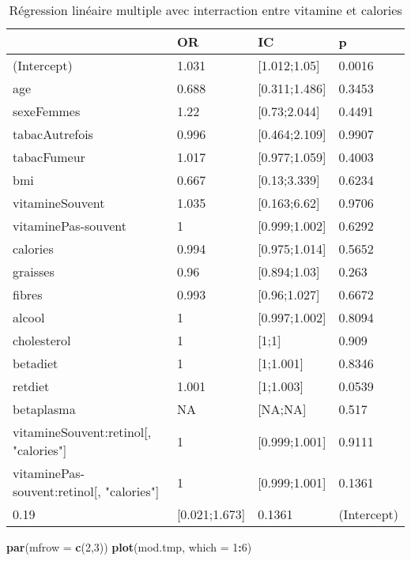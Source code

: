 \documentclass[]{article}
\newenvironment{Shaded}{\begin{snugshade}}{\end{snugshade}}
\newcommand{\KeywordTok}[1]{\textcolor[rgb]{0.13,0.29,0.53}{\textbf{#1}}}
\newcommand{\DataTypeTok}[1]{\textcolor[rgb]{0.13,0.29,0.53}{#1}}
\newcommand{\DecValTok}[1]{\textcolor[rgb]{0.00,0.00,0.81}{#1}}
\newcommand{\OperatorTok}[1]{\textcolor[rgb]{0.81,0.36,0.00}{\textbf{#1}}}
\newcommand{\NormalTok}[1]{#1}
\begin{document}
\begin{table}

\caption{\label{tab:unnamed-chunk-87}Régression linéaire multiple avec interraction entre vitamine et calories}
\centering
\begin{tabular}[t]{l|l|l|l}
\hline
  & OR & IC & p\\
\hline
\rowcolor[HTML]{BBD2E1}  (Intercept) & 1.031 & [1.012;1.05] & 0.0016\\
\hline
age & 0.688 & [0.311;1.486] & 0.3453\\
\hline
\rowcolor[HTML]{BBD2E1}  sexeFemmes & 1.22 & [0.73;2.044] & 0.4491\\
\hline
tabacAutrefois & 0.996 & [0.464;2.109] & 0.9907\\
\hline
\rowcolor[HTML]{BBD2E1}  tabacFumeur & 1.017 & [0.977;1.059] & 0.4003\\
\hline
bmi & 0.667 & [0.13;3.339] & 0.6234\\
\hline
\rowcolor[HTML]{BBD2E1}  vitamineSouvent & 1.035 & [0.163;6.62] & 0.9706\\
\hline
vitaminePas-souvent & 1 & [0.999;1.002] & 0.6292\\
\hline
\rowcolor[HTML]{BBD2E1}  calories & 0.994 & [0.975;1.014] & 0.5652\\
\hline
graisses & 0.96 & [0.894;1.03] & 0.263\\
\hline
\rowcolor[HTML]{BBD2E1}  fibres & 0.993 & [0.96;1.027] & 0.6672\\
\hline
alcool & 1 & [0.997;1.002] & 0.8094\\
\hline
\rowcolor[HTML]{BBD2E1}  cholesterol & 1 & [1;1] & 0.909\\
\hline
betadiet & 1 & [1;1.001] & 0.8346\\
\hline
\rowcolor[HTML]{BBD2E1}  retdiet & 1.001 & [1;1.003] & 0.0539\\
\hline
betaplasma & NA & [NA;NA] & 0.517\\
\hline
\rowcolor[HTML]{BBD2E1}  vitamineSouvent:retinol[, "calories"] & 1 & [0.999;1.001] & 0.9111\\
\hline
vitaminePas-souvent:retinol[, "calories"] & 1 & [0.999;1.001] & 0.1361\\
\hline
\rowcolor[HTML]{BBD2E1}  0.19 & [0.021;1.673] & 0.1361 & (Intercept)\\
\hline
\end{tabular}
\end{table}

\begin{Shaded}
\begin{Highlighting}[]
\KeywordTok{par}\NormalTok{(}\DataTypeTok{mfrow =} \KeywordTok{c}\NormalTok{(}\DecValTok{2}\NormalTok{,}\DecValTok{3}\NormalTok{))}
\KeywordTok{plot}\NormalTok{(mod.tmp, }\DataTypeTok{which =} \DecValTok{1}\OperatorTok{:}\DecValTok{6}\NormalTok{)}
\end{Highlighting}
\end{Shaded}
\end{document}
